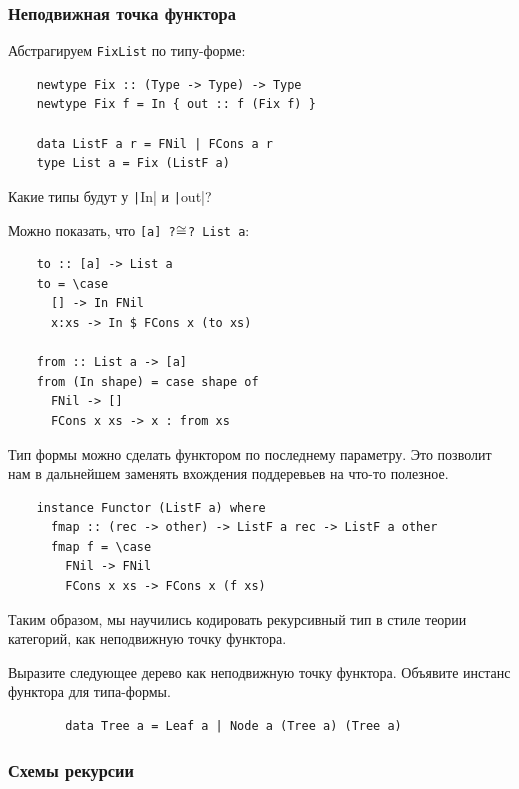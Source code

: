 \subsubsection{Неподвижная точка функтора} \label{subsubsec:functor-fixpoint}

Абстрагируем \texttt{FixList} по типу-форме:
\begin{verbatim}
    newtype Fix :: (Type -> Type) -> Type
    newtype Fix f = In { out :: f (Fix f) }

    data ListF a r = FNil | FCons a r
    type List a = Fix (ListF a)
\end{verbatim}

\begin{task}
    Какие типы будут у \texttt|In| и \texttt|out|?
\end{task}

Можно показать, что \texttt{[a] ?$\cong$? List a}:
\begin{verbatim}
    to :: [a] -> List a
    to = \case
      [] -> In FNil
      x:xs -> In $ FCons x (to xs)

    from :: List a -> [a]
    from (In shape) = case shape of
      FNil -> []
      FCons x xs -> x : from xs
\end{verbatim}

Тип формы можно сделать функтором по последнему параметру.
Это позволит нам в дальнейшем заменять вхождения поддеревьев на что-то полезное.
\begin{verbatim}
    instance Functor (ListF a) where
      fmap :: (rec -> other) -> ListF a rec -> ListF a other
      fmap f = \case
        FNil -> FNil
        FCons x xs -> FCons x (f xs)
\end{verbatim}

Таким образом, мы научились кодировать рекурсивный тип в стиле теории категорий, как неподвижную точку функтора.

\begin{task}
    Выразите следующее дерево как неподвижную точку функтора.
    Объявите инстанс функтора для типа-формы.
    \begin{verbatim}
        data Tree a = Leaf a | Node a (Tree a) (Tree a)
    \end{verbatim}
\end{task}

\subsubsection{Схемы рекурсии} \label{subsubsec:recursion-schemas}


